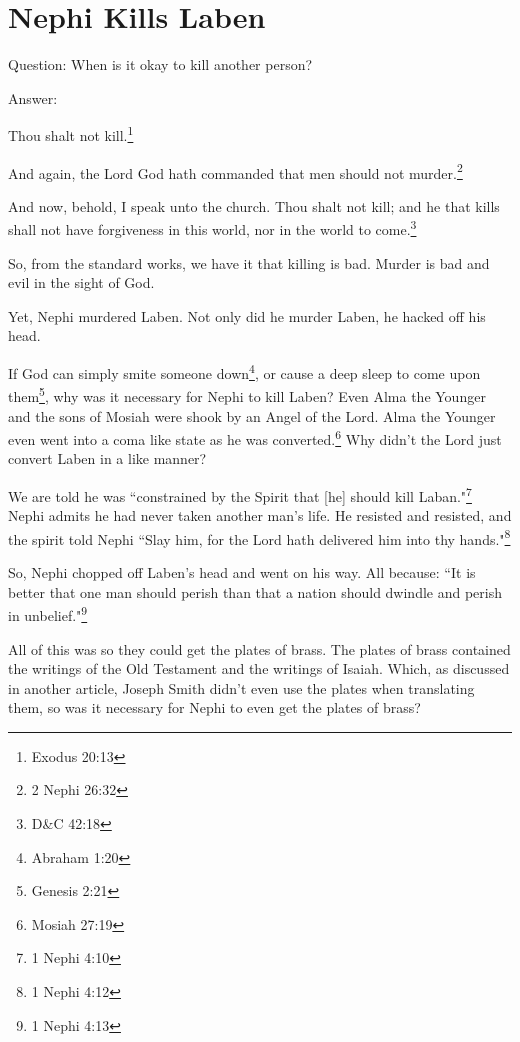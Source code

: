 \chapter{Nephi Kills Laben}

Question: When is it okay to kill another person?

Answer:

\begin{displayquote}
Thou shalt not kill.\footnote{Exodus 20:13}
\end{displayquote}

\begin{displayquote}
And again, the Lord God hath commanded that men should not 
murder.\footnote{2 Nephi 26:32}
\end{displayquote}

\begin{displayquote}
And now, behold, I speak unto the church. Thou shalt not kill; 
and he that kills shall not have forgiveness in this world, nor in the 
world to come.\footnote{D\&C 42:18}
\end{displayquote}

So, from the standard works, we have it that killing is bad. Murder is bad and evil
in the sight of God.

Yet, Nephi murdered Laben. Not only did he murder Laben, he hacked off his head.

If God can simply smite someone down\footnote{Abraham 1:20}, or cause a deep sleep 
to come upon them\footnote{Genesis 2:21}, why was it necessary for Nephi to kill 
Laben? Even Alma the Younger and the sons of Mosiah were shook by an Angel of the 
Lord. Alma the Younger even went into a coma like state as he was 
converted.\footnote{Mosiah 27:19} Why didn't the Lord just convert Laben in a like 
manner?

We are told he was ``constrained by the Spirit that [he] should kill 
Laban."\footnote{1 Nephi 4:10} Nephi admits he had never taken
another man's life. He resisted and resisted, and the spirit told Nephi ``Slay him,
for the Lord hath delivered him into thy hands."\footnote{1 Nephi 4:12}

So, Nephi chopped off Laben's head and went on his way. All because: ``It is better
that one man should perish than that a nation should dwindle and perish in
unbelief."\footnote{1 Nephi 4:13}

All of this was so they could get the plates of brass. The plates of brass contained
the writings of the Old Testament and the writings of Isaiah. Which, as discussed in
another article, Joseph Smith didn't even use the plates when translating them, so
was it necessary for Nephi to even get the plates of brass?

